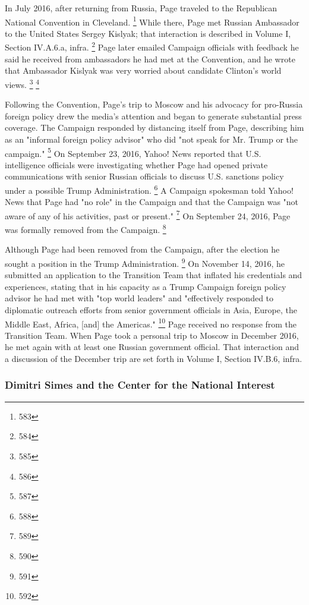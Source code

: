 In July 2016, after returning from Russia, Page traveled to the Republican National Convention in Cleveland.%
\footnote{583}
While there, Page met Russian Ambassador to the United States Sergey Kislyak; that interaction is described in Volume I, Section IV.A.6.a, infra.%
\footnote{584}
Page later emailed Campaign officials with feedback he said he received from ambassadors he had met at the Convention, and he wrote that Ambassador Kislyak was very worried about candidate Clinton's world views.%
\footnote{585}
\footnote{586}

Following the Convention, Page's trip to Moscow and his advocacy for pro-Russia foreign policy drew the media's attention and began to generate substantial press coverage.
The Campaign responded by distancing itself from Page, describing him as an "informal foreign policy advisor" who did "not speak for Mr. Trump or the campaign."%
\footnote{587}
On September 23, 2016, Yahoo! News reported that U.S. intelligence officials were investigating whether Page had opened private communications with senior Russian officials to discuss U.S. sanctions policy under a possible Trump Administration.%
\footnote{588}
A Campaign spokesman told Yahoo! News that Page had "no role" in the Campaign and that the Campaign was "not aware of any of his activities, past or present."%
\footnote{589}
On September 24, 2016, Page was formally removed from the Campaign.%
\footnote{590}

Although Page had been removed from the Campaign, after the election he sought a position in the Trump Administration.%
\footnote{591}
On November 14, 2016, he submitted an application to the Transition Team that inflated his credentials and experiences, stating that in his capacity as a Trump Campaign foreign policy advisor he had met with "top world leaders" and "effectively responded to diplomatic outreach efforts from senior government officials in Asia, Europe, the Middle East, Africa, [and] the Americas."%
\footnote{592}
Page received no response from the Transition Team.
When Page took a personal trip to Moscow in December 2016, he met again with at least one Russian government official.
That interaction and a discussion of the December trip are set forth in Volume I, Section IV.B.6, infra.

\subsubsection{Dimitri Simes and the Center for the National Interest}

